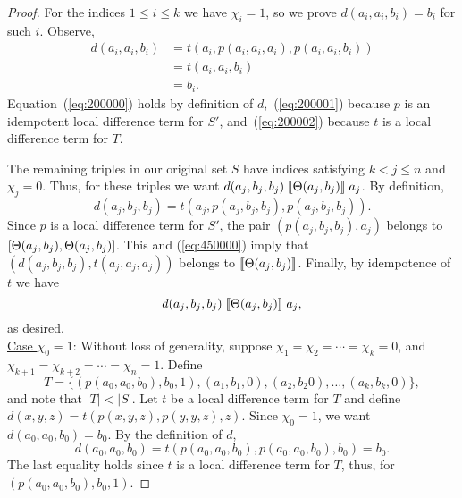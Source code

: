 \begin{proof}
For the indices $1\leq i \leq k$ we have $\chi_i =1$, so we prove
$d(a_i,a_i,b_i) = b_i$ for such $i$. Observe,
\begin{align}
  d(a_i,a_i,b_i) &=
  t(a_i, p(a_i,a_i,a_i), p(a_i,a_i,b_i)) \label{eq:200000}\\
  &=t(a_i, a_i, b_i) \label{eq:200001}\\
  &=b_i. \label{eq:200002}
\end{align}
Equation~(\ref{eq:200000}) holds by definition of $d$,~(\ref{eq:200001})
because $p$ is an idempotent local difference term for
$S'$, and~(\ref{eq:200002}) because $t$ is a local difference term for $T$.

The remaining triples in our original set $S$
have indices satisfying $k<j\leq n$ and $\chi_j = 0$.
Thus, for these triples we want
$d(a_j,b_j,b_j)\mathrel{\llbracket \Theta(a_j,b_j) \rrbracket} a_j$.
By definition,
\begin{equation}
  \label{eq:450000}
d(a_j,b_j,b_j) =t(a_j, p(a_j,b_j,b_j), p(a_j,b_j,b_j)).  
\end{equation}
Since $p$ is a local difference term for $S'$, %
the pair $(p(a_j,b_j,b_j), a_j)$ belongs to $[\Theta(a_j,b_j), \Theta(a_j,b_j)]$.
This and 
(\ref{eq:450000}) imply
that 
$(d(a_j, b_j,b_j), t(a_j,a_j,a_j))$
belongs to
$\llbracket \Theta(a_j,b_j) \rrbracket$.
Finally, by idempotence of $t$ we have
\[
d(a_j,b_j,b_j)\mathrel{\llbracket \Theta(a_j,b_j) \rrbracket} a_j,\]
as desired.
\\[6pt]
\underline{Case $\chi_0 = 1$}:
Without loss of generality, suppose $\chi_1 = \chi_2 =\cdots =\chi_k = 0$,
and $\chi_{k+1} = \chi_{k+2} = \cdots = \chi_{n} = 1$. Define 
\[
T = \{(p(a_0, a_0, b_0), b_0, 1),
(a_1, b_1, 0), (a_2, b_2 0), \dots, (a_k, b_k, 0)\},
\]
and note that $|T| < |S|$.
Let $t$ be a local difference term for $T$ and
define
$d(x,y,z) = t(p(x,y,z), p(y,y,z), z)$. 
Since $\chi_0 =1$, we want $d(a_0,a_0,b_0) = b_0$. By the definition of
$d$,
\begin{equation*}
  d(a_0,a_0,b_0) =
  t(p(a_0,a_0,b_0), p(a_0,a_0,b_0), b_0) =b_0.
\end{equation*}
The last equality holds since $t$ is a local difference term for $T$, thus,
for $(p(a_0, a_0, b_0), b_0, 1)$.


\end{proof}
